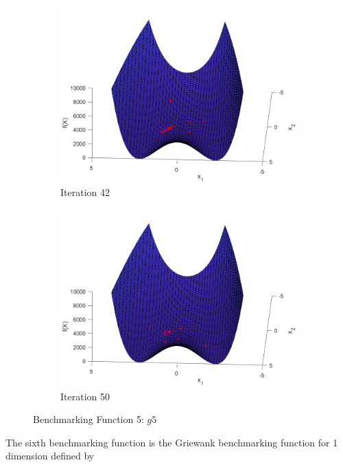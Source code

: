 \begin{figure}
\begin{subfigure}[b]{0.4\textwidth}
    \includegraphics[width=\textwidth]{img/smpl/rosn2d-1-100/loa-iter-42}
    \caption{Iteration 42}
    \label{fig:s5-iter-6}
  \end{subfigure}
  \begin{subfigure}[b]{0.4\textwidth}
    \includegraphics[width=\textwidth]{img/smpl/rosn2d-1-100/loa-iter-50}
    \caption{Iteration 50}
    \label{fig:s5-iter-7}
  \end{subfigure}
  \caption{Benchmarking Function 5: $g5$}
\end{figure}


\par The sixth benchmarking function is the Griewank benchmarking function for 1 dimension defined by


